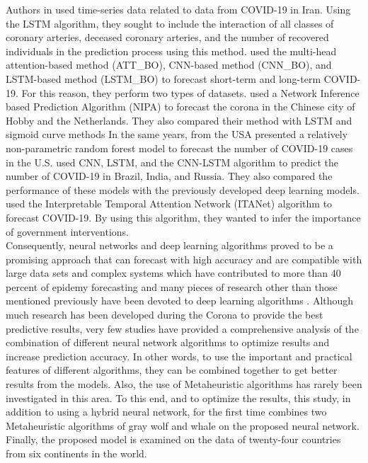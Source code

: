 \documentclass{article}
\begin{document}
Authors in \cite{kafieh2020isfahan} used time-series data related to data from COVID-19 in Iran. Using the LSTM algorithm, they sought to include the interaction of all classes of coronary arteries, deceased coronary arteries, and the number of recovered individuals in the prediction process using this method.  \cite{abbasimehr2021prediction} used the multi-head attention-based method (ATT\_BO), CNN-based method (CNN\_BO), and LSTM-based method (LSTM\_BO) to forecast short-term and long-term COVID-19. For this reason, they perform two types of datasets. \cite{achterberg2020comparing} used a Network Inference based Prediction Algorithm (NIPA) to forecast the corona in the Chinese city of Hobby and the Netherlands. They also compared their method with LSTM and sigmoid curve methods In the same years, \cite{galasso2022random} from the USA presented a relatively non-parametric random forest model to forecast the number of COVID-19 cases in the U.S. \cite{xu2022forecasting} used CNN, LSTM, and the CNN-LSTM algorithm to predict the number of COVID-19 in Brazil, India, and Russia. They also compared the performance of these models with the previously developed deep learning models. \cite{zhou2022interpretable} used the Interpretable Temporal Attention Network (ITANet) algorithm to forecast COVID-19. By using this algorithm, they wanted to infer the importance of government interventions.\\

Consequently, neural networks and deep learning algorithms proved to be a promising approach that can forecast with high accuracy and are compatible with large data sets and complex systems which have contributed to more than 40 percent of epidemy forecasting \cite{rahimi2021review} and many pieces of research other than those mentioned previously have been devoted to deep learning algorithms \cite{chimmula2020time,ayyoubzadeh2020predicting,fong2020finding,tamang2020forecasting,horby2020effect,sujath2020machine,sholehrasa2024integrating}. Although much research has been developed during the Corona to provide the best predictive results, very few studies have provided a comprehensive analysis of the combination of different neural network algorithms to optimize results and increase prediction accuracy. In other words, to use the important and practical features of different algorithms, they can be combined together to get better results from the models. Also, the use of Metaheuristic algorithms has rarely been investigated in this area. To this end, and to optimize the results, this study, in addition to using a hybrid neural network, for the first time combines two Metaheuristic algorithms of gray wolf and whale on the proposed neural network. Finally, the proposed model is examined on the data of twenty-four countries from six continents in the world.\\ 
\end{document}
